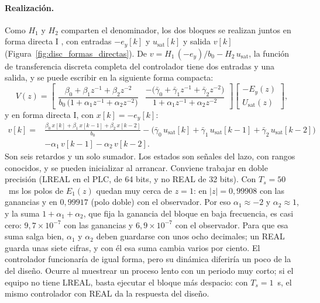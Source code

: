\paragraph{Realización.} Como $H_1$ y $H_2$ comparten el denominador, los dos
bloques se realizan juntos en forma directa I \cite{chen1993analog}, con
entradas $-e_y[k]$ y $u_{\mathrm{sat}}[k]$ y salida $v[k]$
(Figura~\ref{fig:disc_formas_directas}). De
$v = H_1\,(-e_y)/b_0 - H_2\,u_{\mathrm{sat}}$, la función de transferencia
discreta completa del controlador tiene dos entradas y una salida, y se puede escribir en la
siguiente forma compacta:
\begin{equation}
V(z) =
\begin{bmatrix}
\dfrac{\beta_0 + \beta_1 z^{-1} + \beta_2 z^{-2}}{b_0\,\bigl(1 + \alpha_1 z^{-1} + \alpha_2 z^{-2}\bigr)}
&
\dfrac{-\bigl(\bar{\gamma}_0 + \bar{\gamma}_1 z^{-1} + \bar{\gamma}_2 z^{-2}\bigr)}{1 + \alpha_1 z^{-1} + \alpha_2 z^{-2}}
\end{bmatrix}
\begin{bmatrix} -E_y(z) \\[4pt] U_{\mathrm{sat}}(z) \end{bmatrix},
\label{eq:disc_gpi_miso}
\end{equation}
y en forma directa I, con $x[k] = -e_y[k]$:
\begin{equation}
\begin{aligned}
v[k] = {} & \frac{\beta_0\,x[k] + \beta_1\,x[k-1] + \beta_2\,x[k-2]}{b_0}
- \bigl(\bar{\gamma}_0\,u_{\mathrm{sat}}[k] + \bar{\gamma}_1\,u_{\mathrm{sat}}[k-1] + \bar{\gamma}_2\,u_{\mathrm{sat}}[k-2]\bigr) \\
& - \alpha_1\,v[k-1] - \alpha_2\,v[k-2] .
\end{aligned}
\label{eq:disc_gpi_fd1}
\end{equation}
Son seis retardos y un solo sumador. Los estados son señales del lazo, con
rangos conocidos, y se pueden inicializar al arrancar. Conviene trabajar en doble precisión (LREAL en el PLC, de 64 bits, y no REAL de 32 bits).
Con $T_s = 50$~ms los polos de $E_1(z)$ quedan muy cerca de $z = 1$: en $|z| = 0{,}99908$ con
las ganancias y en $0{,}99917$ (polo doble) con el observador. Por eso $\alpha_1 \approx -2$ y
$\alpha_2 \approx 1$, y la suma $1 + \alpha_1 + \alpha_2$, que fija la ganancia del bloque en baja
frecuencia, es casi cero: $9{,}7\times10^{-7}$ con las ganancias y $6{,}9\times10^{-7}$ con el
observador. Para que esa suma salga bien, $\alpha_1$ y $\alpha_2$ deben guardarse con unos ocho
decimales; un REAL guarda unas siete cifras, y con él esa suma cambia varios por ciento. El controlador funcionaría de igual forma, pero su dinámica diferiría
un poco de la del diseño. Ocurre al muestrear un proceso lento con un periodo muy corto; si el equipo
no tiene LREAL, basta ejecutar el bloque más despacio: con $T_s = 1$~s, el mismo controlador con REAL
da la respuesta del diseño.

